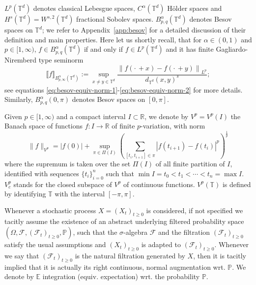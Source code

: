 \documentclass[11pt,oneside,reqno]{amsart}
\numberwithin{equation}{section}
\begin{document}
$L^p (\mathbb{T}^d)$ denotes classical Lebesgue spaces, $C^{\alpha}
(\mathbb{T}^d)$ H\"{o}lder spaces and $H^s (\mathbb{T}^d) = W^{s, 2}
(\mathbb{T}^d)$ fractional Sobolev spaces.
$B^{\alpha}_{p, q} (\mathbb{T}^d)$ denotes Besov spaces on $\mathbb{T}^d$; we refer to Appendix~\ref{app:besov} for a detailed discussion of their definition and main properties. Here let us shortly recall, that for $\alpha\in (0,1)$ and $p\in [1,\infty)$, $f \in B^\alpha_{p,q}(\mathbb{T}^d)$ if and only if $f\in L^p(\mathbb{T}^d)$ and it has finite Gagliardo-Niremberd type seminorm
%
\begin{equation}
\llbracket f\rrbracket_{B^\alpha_{p,\infty}(\mathbb{T}^d)}:= \sup_{x \neq y
     \in \mathbb{T}^d} \frac{\left\| f \left( \cdot \, + x \right) - f \left(
     \cdot \, + y \right) \right\|_{L^p}}{d_{\mathbb{T}^d} (x, y)^s};
\end{equation}
%
see equations \eqref{eq:besov-equiv-norm-1}-\eqref{eq:besov-equiv-norm-2} for more details.
Similarly, $B^{\alpha}_{p, q} (0, \pi)$ denotes
Besov spaces on $[0, \pi]$.

Given $p \in [1, \infty)$ and a compact interval $I \subset
\mathbb{R}$, we denote by $V^p = V^p (I)$ the Banach space of functions $f : I
\rightarrow \mathbb{R}$ of finite $p$-variation, with norm
\[ \| f \|_{V^p} = | f (0) | + \sup_{\pi \in \Pi (I)} \left( \sum_{[t_i, t_{i
   + 1}] \in \pi} | f (t_{i + 1}) - f (t_i) |^p \right)^{\frac{1}{p}} \]
where the supremum is taken over the set $\Pi (I)$ of all finite partition of
$I$, identified with sequences $\{ t_i \}_{i = 0}^n$ such that $\min I = t_0 <
t_1 < \cdots < t_n = \max I$. $V^p_c$ stands for the closed subspace of $V^p$
of continuous functions. $V^p (\mathbb{T})$ is defined by identifying
$\mathbb{T}$ with the interval $[- \pi, \pi]$.

Whenever a stochastic process $X = (X_t)_{t \geqslant 0}$ is considered, if
not specified we tacitly assume the existence of an abstract underlying
filtered probability space $(\Omega, \mathcal{F}, (\mathcal{F}_t)_{t \geqslant
0}, \mathbb{P})$, such that the $\sigma$-algebra $\mathcal{F}$ and the
filtration $(\mathcal{F}_t)_{t \geqslant 0}$ satisfy the usual assumptions and
$(X_t)_{t \geqslant 0}$ is adapted to $(\mathcal{F}_t)_{t \geqslant 0}$.
Whenever we say that $(\mathcal{F}_t)_{t \geqslant 0}$ is the natural
filtration generated by $X$, then it is tacitly implied that it is actually
its right continuous, normal augmentation wrt. $\mathbb{P}$. We denote by
$\mathbb{E}$ integration (equiv. expectation) wrt. the probability
$\mathbb{P}$.
\end{document}
